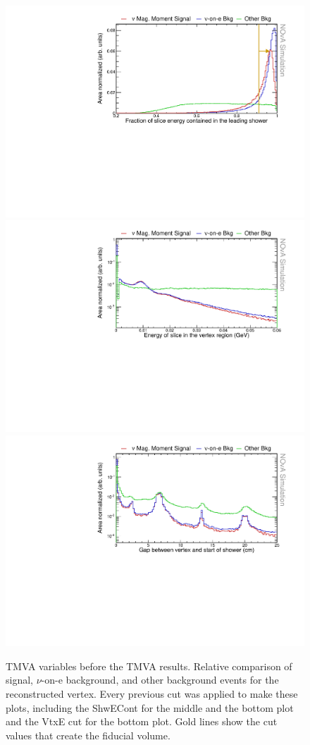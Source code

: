 \begin{figure}[hbtp]
\centering
\includegraphics[width=.9\textwidth]{Plots/NuMMEventSelection/N1Cut_shwEFracPre.pdf}
\includegraphics[width=.9\textwidth]{Plots/NuMMEventSelection/LogY_N1Cut_vtxEPre.pdf}
\includegraphics[width=.9\textwidth]{Plots/NuMMEventSelection/LogY_N1Cut_gapPre.pdf}
\caption{TMVA variables before the TMVA results. Relative comparison of signal, $\nu$-on-e background, and other background events for the reconstructed vertex. Every previous cut was applied to make these plots, including the ShwECont for the middle and the bottom plot and the VtxE cut for the bottom plot. Gold lines show the cut values that create the fiducial volume.}
\label{fig:SingleShowerCutsOld}
\end{figure}


